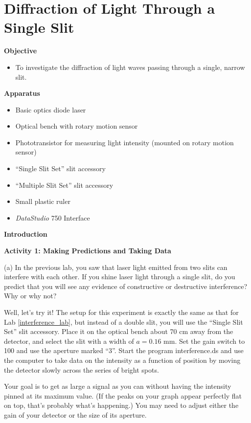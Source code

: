 
\section{Diffraction of Light Through a Single Slit}

\makelabheader %

\textbf{Objective}

\begin{itemize}
\item To investigate the diffraction of light waves passing through
a single, narrow slit. 
\end{itemize}
\textbf{Apparatus}

\begin{itemize}
\item Basic optics diode laser
\item Optical bench with rotary motion sensor
\item Phototransistor for measuring light intensity (mounted on rotary motion sensor)
\item ``Single Slit Set'' slit accessory
\item ``Multiple Slit Set'' slit accessory
\item Small plastic ruler
\item {\it DataStudio} 750 Interface
\end{itemize}
\textbf{Introduction}

\textbf{Activity 1: Making Predictions and Taking Data}

(a) In the previous lab, you saw that laser light emitted from two slits can interfere with each other.  If you shine laser light through a single slit, do you predict that you will see any evidence of constructive or destructive interference?  Why or why not?
\answerspace{0.8in}


Well, let's try it!  The setup for this experiment is exactly the same as that for Lab \ref{interference_lab},  but instead of a double slit, you will use the ``Single Slit Set'' slit accessory.  Place it on the optical bench about 70 cm away from the detector, and select the slit with a width of $a = 0.16$ mm.   Set the gain switch to 100 and use the aperture marked ``3''.   Start the program interference.ds and use the computer to take data on the intensity as a function of position by moving the detector slowly across the series of bright spots.  

Your goal is to get as large a signal as you can without having the intensity pinned at its maximum value.  (If the peaks on your graph appear perfectly flat on top, that's probably what's happening.) You may need to adjust either the gain of your detector or the size of its aperture.

